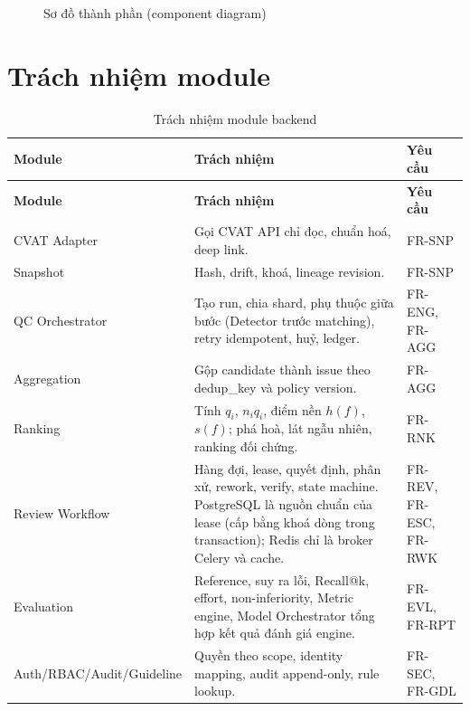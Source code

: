 \begin{figure}[H]
{}
\caption{Sơ đồ thành phần (component diagram)}
\label{fig:components}
\end{figure}

\section{Trách nhiệm module}
\begin{xltabular}{\linewidth}{@{}L{3.4cm}Y L{2.4cm}@{}}
\caption{Trách nhiệm module backend}\label{tab:modules}\\
\toprule
\textbf{Module} & \textbf{Trách nhiệm} & \textbf{Yêu cầu}\\
\midrule
\endfirsthead
\toprule \textbf{Module} & \textbf{Trách nhiệm} & \textbf{Yêu cầu}\\ \midrule
\endhead
\bottomrule
\endfoot
CVAT Adapter & Gọi CVAT API chỉ đọc, chuẩn hoá, deep link. & FR-SNP\\
Snapshot & Hash, drift, khoá, lineage revision. & FR-SNP\\
QC Orchestrator & Tạo run, chia shard, phụ thuộc giữa bước (Detector trước matching), retry idempotent, huỷ, ledger. & FR-ENG, FR-AGG\\
Aggregation & Gộp candidate thành issue theo dedup\_key và policy version. & FR-AGG\\
Ranking & Tính \(q_i\), \(n_i q_i\), điểm nền \(h(f)\), \(s(f)\); phá hoà, lát ngẫu nhiên, ranking đối chứng. & FR-RNK\\
Review Workflow & Hàng đợi, lease, quyết định, phân xử, rework, verify, state machine. PostgreSQL là nguồn chuẩn của lease (cấp bằng khoá dòng trong transaction); Redis chỉ là broker Celery và cache. & FR-REV, FR-ESC, FR-RWK\\
Evaluation & Reference, suy ra lỗi, Recall@k, effort, non-inferiority, Metric engine, Model Orchestrator tổng hợp kết quả đánh giá engine. & FR-EVL, FR-RPT\\
Auth/RBAC/Audit/Guideline & Quyền theo scope, identity mapping, audit append-only, rule lookup. & FR-SEC, FR-GDL\\
\end{xltabular}


